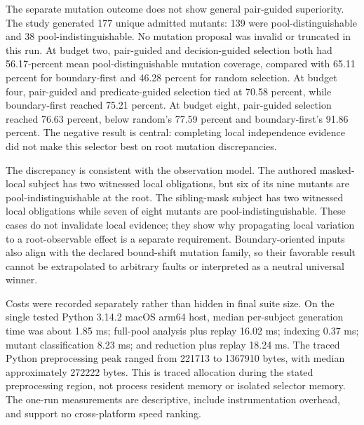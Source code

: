 \documentclass[sigconf,nonacm]{acmart}
\begin{document}
The separate mutation outcome does not show general pair-guided superiority. The study generated 177 unique admitted mutants: 139 were pool-distinguishable and 38 pool-indistinguishable. No mutation proposal was invalid or truncated in this run. At budget two, pair-guided and decision-guided selection both had 56.17-percent mean pool-distinguishable mutation coverage, compared with 65.11 percent for boundary-first and 46.28 percent for random selection. At budget four, pair-guided and predicate-guided selection tied at 70.58 percent, while boundary-first reached 75.21 percent. At budget eight, pair-guided selection reached 76.63 percent, below random's 77.59 percent and boundary-first's 91.86 percent. The negative result is central: completing local independence evidence did not make this selector best on root mutation discrepancies.

The discrepancy is consistent with the observation model. The authored masked-local subject has two witnessed local obligations, but six of its nine mutants are pool-indistinguishable at the root. The sibling-mask subject has two witnessed local obligations while seven of eight mutants are pool-indistinguishable. These cases do not invalidate local evidence; they show why propagating local variation to a root-observable effect is a separate requirement. Boundary-oriented inputs also align with the declared bound-shift mutation family, so their favorable result cannot be extrapolated to arbitrary faults or interpreted as a neutral universal winner.

Costs were recorded separately rather than hidden in final suite size. On the single tested Python 3.14.2 macOS arm64 host, median per-subject generation time was about 1.85 ms; full-pool analysis plus replay 16.02 ms; indexing 0.37 ms; mutant classification 8.23 ms; and reduction plus replay 18.24 ms. The traced Python preprocessing peak ranged from 221713 to 1367910 bytes, with median approximately 272222 bytes. This is traced allocation during the stated preprocessing region, not process resident memory or isolated selector memory. The one-run measurements are descriptive, include instrumentation overhead, and support no cross-platform speed ranking.
\end{document}

